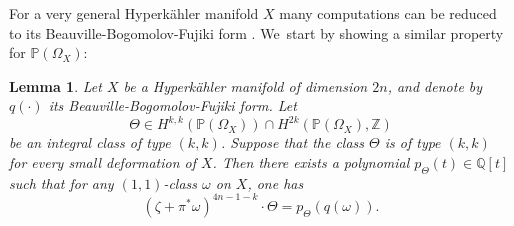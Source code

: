 \documentclass[11pt]{article}
\theoremstyle{plain}
\newtheorem{lemma}[theorem]{Lemma}
\theoremstyle{definition}
\newcommand{\Q}{\ensuremath{\mathbb{Q}}}
\newcommand{\Z}{\ensuremath{\mathbb{Z}}}
\newcommand{\PP}{\ensuremath{\mathbb{P}}}
\begin{document}
For a very general Hyperkähler manifold $X$ many computations can be reduced to its Beauville-Bogomolov-Fujiki form \cite{Huy99}. We~start by showing a similar property for $\PP(\Omega_X)$:

\begin{lemma}\label{lemmakeycomputation}
Let $X$ be a Hyperkähler manifold of dimension $2n$, and denote by $q(\cdot)$ its Beauville-Bogomolov-Fujiki form.
Let
\[
\Theta \in
H^{k,k}(\PP(\Omega_X))\cap H^{2k}(\PP(\Omega_X),\Z)
\]
be an integral class of type $(k,k)$. Suppose that the class $\Theta$ is of type $(k,k)$ for every small deformation
of $X$.
Then there exists a polynomial
$p_\Theta(t) \in \Q[t]$ such that for any $(1,1)$-class $\omega$ on $X$, one has
\[
(\zeta + \pi^* \omega)^{4n-1-k} \cdot \Theta = p_\Theta(q(\omega)).
\]
\end{lemma}
\end{document}
